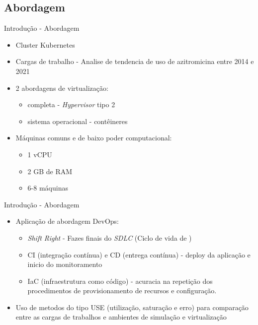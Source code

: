 \documentclass[10pt,brazil]{beamer}
\theoremstyle{definition}
\begin{document}
\subsection{Abordagem}
\begin{frame}{Introdução - Abordagem}
  \begin{itemize}

    \item Cluster Kubernetes\textregistered
    \item Cargas de trabalho - Analise de tendencia de uso de azitromicina entre 2014 e 2021
    \item 2 abordagens de virtualização:
          \begin{itemize}
            \item completa - \emph{Hypervisor} tipo 2
            \item sistema operacional - contêineres
          \end{itemize}
    \item Máquinas comuns e de baixo poder computacional:
          \begin{itemize}
            \item 1 vCPU
            \item 2 GB de RAM
            \item 6-8 máquinas
          \end{itemize}
  \end{itemize}
\end{frame}

\begin{frame}{Introdução - Abordagem}
  \begin{itemize}
    \item Aplicação de abordagem DevOps:
          \begin{itemize}
            \item \emph{Shift Right} - Fazes finais do \emph{SDLC} (Ciclo de vida de )
            \item CI (integração contínua) e CD (entrega contínua) - deploy da aplicação e inicio do monitoramento
            \item IaC (infraestrutura como código) - acuracia na repetição dos procedimentos de provisionamento de recursos e configuração.
          \end{itemize}
    \item Uso de metodos do tipo USE (utilização, saturação e erro) para comparação entre as cargas de trabalhos e ambientes de simulação e virtualização
  \end{itemize}
\end{frame}
\end{document}

